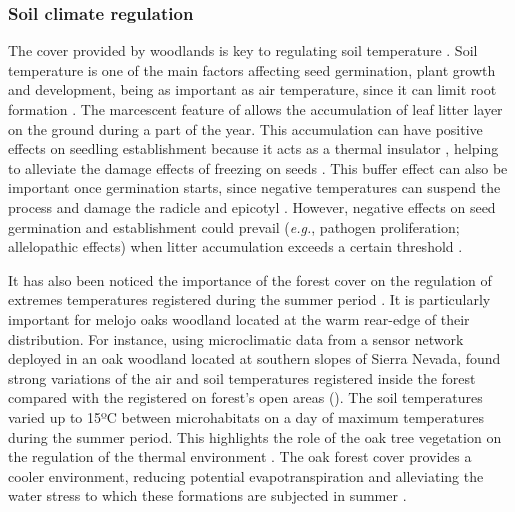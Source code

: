 \subsubsection{Soil climate regulation}\label{sec:es:regulation-soil}
The cover provided by woodlands is key to regulating soil temperature \autocite{Ellisonetal2017TreesForests}. Soil temperature is one of the main factors affecting seed germination, plant growth and development, being as important as air temperature, since it can limit root formation \autocites{AlvarezUriaKorner2007LowTemperature}. The marcescent feature of \Qp allows the accumulation of leaf litter layer on the ground during a part of the year. This accumulation can have positive effects on seedling establishment because it acts as a thermal insulator \autocites{Loydietal2014DistributionEffects}, helping to alleviate the damage effects of freezing on seeds \autocites{Loydietal2014DistributionEffects,CavenderBaresetal2005SummerWinter,EstesoMartinezGilPelegrin2004FrostResistance,Lofetal2019TammReview}. This buffer effect can also be important once germination starts, since negative temperatures can suspend the process and damage the radicle and epicotyl \autocites{AizenWoodcock1996EffectsAcorn}. However, negative effects on seed germination and establishment could prevail (\emph{e.g.}, pathogen proliferation; allelopathic effects) when litter accumulation exceeds a certain threshold \autocites{Loydietal2014DistributionEffects,XiongNilsson1999EffectsPlant}.

It has also been noticed the importance of the forest cover on the regulation of extremes temperatures registered during the summer period \autocites{DeFrenneetal2021ForestMicroclimates}. It is particularly important for melojo oaks woodland located at the warm rear-edge of their distribution. For instance, using microclimatic data from a sensor network deployed in an oak woodland located at southern slopes of Sierra Nevada, \citet{Zamoraetal2021UniendoMacro} found strong variations of the air and soil temperatures registered inside the \Qp forest compared with the registered on forest's open areas (). The soil temperatures varied up to 15ºC between microhabitats on a day of maximum temperatures during the summer period. This highlights the role of the oak tree vegetation on the regulation of the thermal environment \autocites{Niinemets2010ResponsesForest}. The oak forest cover provides a cooler environment, reducing potential evapotranspiration and alleviating the water stress to which these formations are subjected in summer \autocites{Zamoraetal2021UniendoMacro}.  

